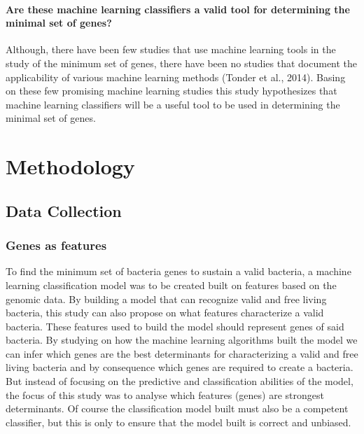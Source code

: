 \documentclass[]{report}
\begin{document}
\subsubsection{Are these machine learning classifiers a valid tool for
determining the minimal set of
genes?}\label{are-these-machine-learning-classifiers-a-valid-tool-for-determining-the-minimal-set-of-genes}

Although, there have been few studies that use machine learning tools in
the study of the minimum set of genes, there have been no studies that
document the applicability of various machine learning methods (Tonder
et al., 2014). Basing on these few promising machine learning studies
this study hypothesizes that machine learning classifiers will be a
useful tool to be used in determining the minimal set of genes.

\chapter{Methodology}\label{methodology}

\section{Data Collection}\label{data-collection}

\subsection{Genes as features}\label{genes-as-features}

To find the minimum set of bacteria genes to sustain a valid bacteria, a
machine learning classification model was to be created built on
features based on the genomic data. By building a model that can
recognize valid and free living bacteria, this study can also propose on
what features characterize a valid bacteria. These features used to
build the model should represent genes of said bacteria. By studying on
how the machine learning algorithms built the model we can infer which
genes are the best determinants for characterizing a valid and free
living bacteria and by consequence which genes are required to create a
bacteria. But instead of focusing on the predictive and classification
abilities of the model, the focus of this study was to analyse which
features (genes) are strongest determinants. Of course the
classification model built must also be a competent classifier, but this
is only to ensure that the model built is correct and unbiased.
\end{document}
